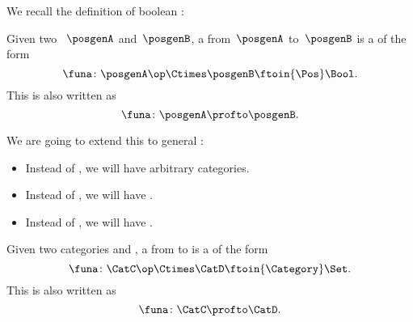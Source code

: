 We recall the definition of boolean :

\begin{ctdefinition}
    \label{def:boolean-profunctor-again}
    Given two ~$\posgenA$ and~$\posgenB$, a  from~$\posgenA$ to~$\posgenB$ is a  of the form
    \begin{equation}
        \label{eq:boolean-profunctor-funa}
        \funa\colon \posgenA\op \Ctimes \posgenB \ftoin{\Pos} \Bool.
    \end{equation}
    This is also written as
    \begin{equation}
        \funa\colon \posgenA \profto \posgenB.
    \end{equation}
\end{ctdefinition}

We are going to extend this to general :
\begin{itemize}
    \item Instead of , we will have arbitrary categories.
    \item Instead of \Bool, we will have \Set.
    \item Instead of  , we will have .
\end{itemize}

\begin{ctdefinition}[Profunctors]
    \label{def:profunctor}
    Given two categories \CatC and \CatD, a  from \CatC to \CatD is a  of the form
    \begin{equation}
        \label{eq:profunctors-def-1}
        \funa\colon \CatC\op \Ctimes \CatD \ftoin{\Category} \Set.
    \end{equation}
    This is also written as
    \begin{equation}
        \label{eq:profunctors-def-2}
        \funa\colon \CatC \profto \CatD.
    \end{equation}
\end{ctdefinition}

